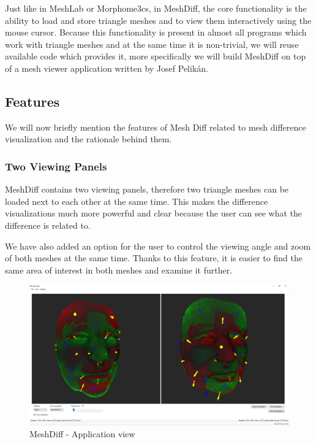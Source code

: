 Just like in MeshLab or Morphome3cs, in MeshDiff, the core functionality is the ability to load and store triangle meshes and to view them interactively using the mouse cursor. Because this functionality is present in almost all programs which work with triangle meshes and at the same time it is non-trivial, we will reuse available code which provides it, more specifically we will build MeshDiff on top of a mesh viewer application written by Josef Pelikán.

\subsection{Features}
\label{sec:meshdiff_features}

We will now briefly mention the features of Mesh Diff related to mesh difference visualization and the rationale behind them.

\subsubsection{Two Viewing Panels}

MeshDiff contains two viewing panels, therefore two triangle meshes can be loaded next to each other at the same time. This makes the difference visualizations much more powerful and clear because the user can see what the difference is related to.

We have also added an option for the user to control the viewing angle and zoom of both meshes at the same time. Thanks to this feature, it is easier to find the same area of interest in both meshes and examine it further.

\begin{figure}[h]
\centering
\includegraphics[width=\textwidth]{./img/meshdiff.PNG}
\caption[MeshDiff - Application view]{MeshDiff - Application view}
\label{fig:meshdiff}
\end{figure}

